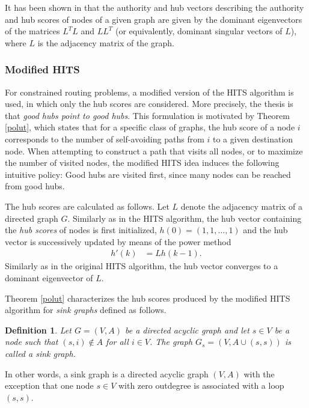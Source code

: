 \documentclass[dissertation,draft*]{aaltoseries}
\newtheorem*{definition}{Definition}
\begin{document}
It has been shown in \cite{farahat} that the authority and hub vectors
describing the authority and hub scores of nodes of a given graph are given by 
the dominant eigenvectors of the matrices $L^TL$ and $LL^T$ 
(or equivalently, dominant singular vectors of $L$), 
where $L$ is the adjacency matrix of the graph. 

\subsubsection{Modified HITS}
\label{modifiedhits}
For constrained routing problems, a modified version of the HITS algorithm is used, in which only the hub scores
are considered. More precisely, the thesis is that \emph{good hubs point to good hubs}. 
This formulation is motivated by Theorem \ref{polut}, which states that for a specific class of graphs,
the hub score of a node $i$ corresponds to the number of self-avoiding paths
from $i$ to a given destination node.
When attempting to construct a path that visits all nodes, or to maximize the number of visited nodes, 
the modified HITS idea induces the following intuitive policy: 
Good hubs are visited first, since many nodes can be reached from good hubs. 

The hub scores are calculated as follows.
Let $L$ denote the adjacency matrix of a directed graph $G$. 
Similarly as in the HITS algorithm, the hub vector containing the \emph{hub scores} of nodes is first initialized, $h(0) = (1,1,\ldots,1)$ 
and the hub vector is successively updated by means of the power method
\begin{align}
\label{modhub}
h'(k) & = L h(k-1).
\end{align}
Similarly as in the original HITS algorithm, the hub vector
converges to a dominant eigenvector of $L$.

Theorem \ref{polut} characterizes the hub scores produced by the modified HITS algorithm for 
\emph{sink graphs} defined as follows.
\begin{definition}
  Let $G=(V,A)$ be a directed acyclic graph and let $s \in V$ be a node such that $(s,i) \notin A$ for all $i \in V$.
The graph $G_s=(V, A \cup (s,s))$ is called a \emph{sink graph}. 
\end{definition}
In other words, a sink graph is a directed acyclic graph $(V,A)$ with the exception that one node $s \in V$ with zero outdegree is
associated with a loop $(s,s)$.
\end{document}

